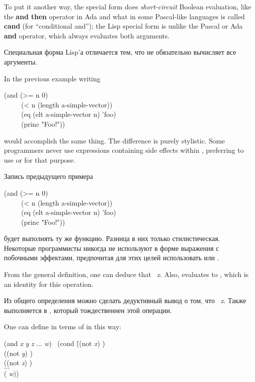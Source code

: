 \begin{defmac}
To put it another way,
the  special form does \emph{short-circuit} Boolean evaluation,
like the \textbf{and then} operator in Ada
and what in some Pascal-like languages is called \textbf{cand} (for ``conditional
and''); the Lisp  special form is
unlike the Pascal or Ada \textbf{and} operator,
which always evaluates both arguments.

Специальная форма Lisp'а  отличается тем, что не
обязательно вычисляет все аргументы.

In the previous example writing
\begin{lisp}
(and (>= n 0) \\
~~~~~(< n (length a-simple-vector)) \\
~~~~~(eq (elt a-simple-vector n) 'foo) \\
~~~~~(princ "Foo!"))
\end{lisp}
would accomplish the same thing.  The difference is purely stylistic.
Some programmers never use expressions containing side effects
within , preferring to use  or  for that purpose.

Запись предыдущего примера
\begin{lisp}
(and (>= n 0) \\
~~~~~(< n (length a-simple-vector)) \\
~~~~~(eq (elt a-simple-vector n) 'foo) \\
~~~~~(princ "Foo!"))
\end{lisp}
будет выполнять ту же функцию. Разница в них только стилистическая. Некоторые
программисты никогда не используют в форме  выражения с побочными
эффектами, предпочитая для этих целей использовать  или . 

From the general definition, one can deduce that
 \EQ\ \emph{x}.  Also,
 evaluates to {\true}, which is an identity for this operation.

Из общего определения можно сделать дедуктивный вывод о том, что 
 \EQ\ \emph{x}. Также  выполняется в {\true},
который тождественнен этой операции.

One can define  in terms of  in this way:
\begin{lisp}
(and \emph{x} \emph{y} \emph{z} ... \emph{w}) \EQ\ (cond \=((not \emph{x}) {\false}) \\
\>((not \emph{y}) {\false}) \\
\>((not \emph{z}) {\false}) \\
\>$\ldots$ \\
\>({\true} \emph{w}))
\end{lisp}


\end{defmac}
